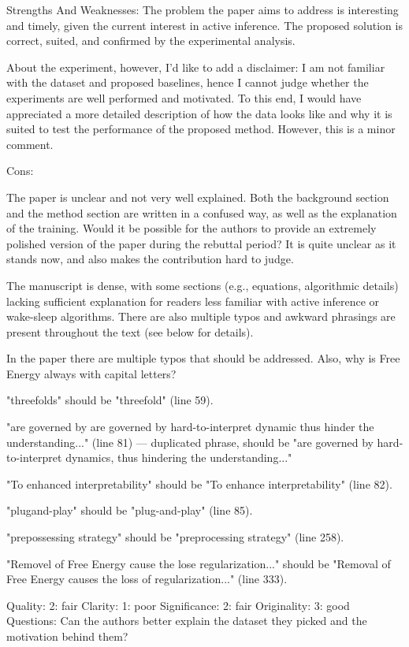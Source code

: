 Strengths And Weaknesses:
The problem the paper aims to address is interesting and timely, given the current interest in active inference. The proposed solution is correct, suited, and confirmed by the experimental analysis.

About the experiment, however, I'd like to add a disclaimer: I am not familiar with the dataset and proposed baselines, hence I cannot judge whether the experiments are well performed and motivated. To this end, I would have appreciated a more detailed description of how the data looks like and why it is suited to test the performance of the proposed method. However, this is a minor comment.

Cons:

The paper is unclear and not very well explained. Both the background section and the method section are written in a confused way, as well as the explanation of the training. Would it be possible for the authors to provide an extremely polished version of the paper during the rebuttal period? It is quite unclear as it stands now, and also makes the contribution hard to judge.

The manuscript is dense, with some sections (e.g., equations, algorithmic details) lacking sufficient explanation for readers less familiar with active inference or wake-sleep algorithms. There are also multiple typos and awkward phrasings are present throughout the text (see below for details).

In the paper there are multiple typos that should be addressed. Also, why is Free Energy always with capital letters?

"threefolds" should be "threefold" (line 59).

"are governed by are governed by hard-to-interpret dynamic thus hinder the understanding..." (line 81) — duplicated phrase, should be "are governed by hard-to-interpret dynamics, thus hindering the understanding..."

"To enhanced interpretability" should be "To enhance interpretability" (line 82).

"plugand-play" should be "plug-and-play" (line 85).

"prepossessing strategy" should be "preprocessing strategy" (line 258).

"Removel of Free Energy cause the lose regularization..." should be "Removal of Free Energy causes the loss of regularization..." (line 333).

Quality: 2: fair
Clarity: 1: poor
Significance: 2: fair
Originality: 3: good
Questions:
Can the authors better explain the dataset they picked and the motivation behind them?

